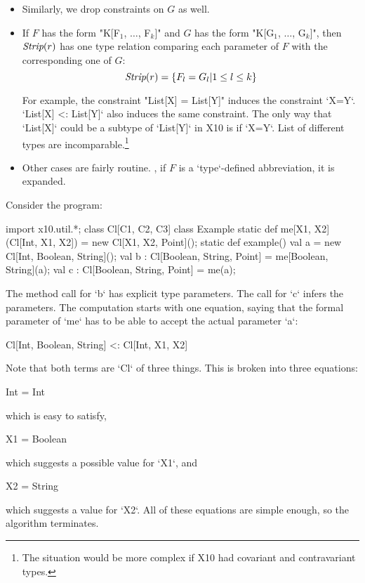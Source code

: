 {\begin{itemize}
\item Similarly, we drop constraints on {$G$} as well.

\item If {$F$} has the form \xcdmath"K[F$_1$, $\ldots$, F$_k$]"
and 
{$G$}
has the form \xcdmath"K[G$_1$, $\ldots$, G$_k$]", 
then {$\mbox{\it Strip}(r)$} has one type relation comparing each parameter of 
{$F$} with the corresponding one of {$G$}: 
\[\mbox{\it Strip}(r) = \{ F_l = G_l | 1 \le l \le k \} \]

For example, the constraint \xcdmath"List[X] = List[Y]" induces the
constraint \xcd`X=Y`.  
\xcd`List[X] <: List[Y]` also induces the same constraint.  The only way that
\xcd`List[X]` could be a subtype of \xcd`List[Y]` in X10 is if \xcd`X=Y`.
List of different types are incomparable.\footnote{The situation would be more
complex if X10 had covariant and contravariant types.}

\item Other cases are fairly routine.  \Eg, if {$F$} is a \xcd`type`-defined
      abbreviation, it is expanded.

\end{itemize}

\begin{ex}
Consider the program: 
\begin{xten}
import x10.util.*;
class Cl[C1, C2, C3]{}
class Example {
  static def me[X1, X2](Cl[Int, X1, X2]) = 
     new Cl[X1, X2, Point]();
  static def example() {
    val a = new Cl[Int, Boolean, String]();
    val b : Cl[Boolean, String, Point] 
          = me[Boolean, String](a);
    val c : Cl[Boolean, String, Point] 
          = me(a);
  }
}
\end{xten}
%
The method call for \xcd`b` has explicit type parameters.  
The call for \xcd`c` infers the parameters.  The computation 
starts with one equation, saying that the formal parameter of 
\xcd`me` has to be able to accept the actual parameter \xcd`a`:
\begin{xtenmath}
 Cl[Int, Boolean, String] <: Cl[Int, X1, X2] 
\end{xtenmath}
Note that both terms are \xcd`Cl` of three things. 
This is broken into three equations: 
\begin{xtenmath}
Int = Int
\end{xtenmath}
which is easy to satisfy,
\begin{xtenmath}
X1 = Boolean
\end{xtenmath}
which suggests a possible value for \xcd`X1`,  and 
\begin{xtenmath}
X2 = String
\end{xtenmath}
which suggests a value for \xcd`X2`.  
All of these equations are simple enough, so the algorithm terminates. 


\end{ex}}
